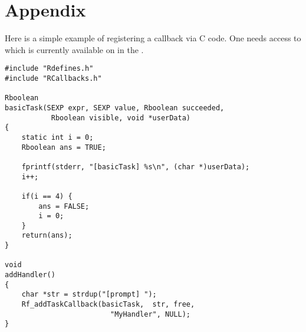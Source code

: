 \documentclass{article}
\begin{document}
\appendix
\section{Appendix}

Here is a simple example of registering a callback via C code.  One
needs access to  which is currently available on in
the .

\begin{verbatim}
#include "Rdefines.h"
#include "RCallbacks.h"

Rboolean
basicTask(SEXP expr, SEXP value, Rboolean succeeded, 
           Rboolean visible, void *userData)
{
    static int i = 0;
    Rboolean ans = TRUE;

    fprintf(stderr, "[basicTask] %s\n", (char *)userData);
    i++;

    if(i == 4) {
        ans = FALSE;
        i = 0;
    }
    return(ans);
}

void
addHandler()
{
    char *str = strdup("[prompt] ");
    Rf_addTaskCallback(basicTask,  str, free, 
                         "MyHandler", NULL);
}
\end{verbatim}
\end{document}
